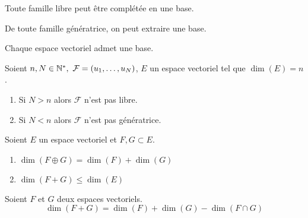 \begin{theorem}
	Toute famille libre peut être complétée en une base.
\end{theorem}

\begin{theorem}
    De toute famille génératrice, on peut extraire une base.
\end{theorem}

\begin{theorem}
    Chaque espace vectoriel admet une base.
\end{theorem}

\begin{corollary}
	Soient $n, N \in \mathbb{N}^*,\ \mathcal{F} = (u_1, \ldots, u_N)$, $E$ un espace vectoriel tel que $\dim(E) = n$.
	\begin{enumerate}
		\item Si $N > n$ alors $\mathcal{F}$ n'est pas libre.
		\item Si $N < n$ alors $\mathcal{F}$ n'est pas génératrice.
	\end{enumerate}
\end{corollary}

\begin{proposition}
	Soient $E$ un espace vectoriel et $F, G\subset E$.
	\begin{multicols}{2}
	    \begin{enumerate}
    		\item $\dim(F \oplus G) = \dim(F) + \dim(G)$ 
    		\item $\dim(F + G) \leq \dim(E)$
    	\end{enumerate}
	\end{multicols}
\end{proposition}

\begin{theorem}
	Soient $F$ et $G$ deux espaces vectoriels.
	\[ \dim(F+G) = \dim(F) + \dim(G) - \dim(F\cap G) \]
\end{theorem}

